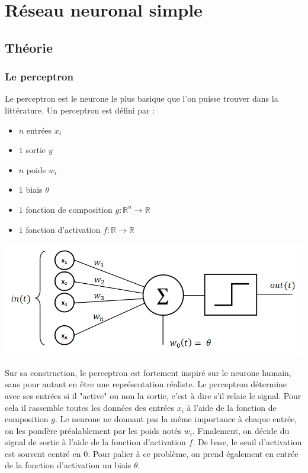 
\chapter{Réseau neuronal simple}

\section{Théorie}

\subsection{Le perceptron}

Le perceptron est le neurone le plus basique que l'on puisse trouver dans la
littérature. Un perceptron est défini par :
\begin{itemize}
\item $n$ entrées $x_i$
\item $1$ sortie $y$
\item $n$ poids $w_i$
\item $1$ biais $\theta$
\item $1$ fonction de composition $g : \mathbb{R}^n \to \mathbb{R}$
\item $1$ fonction d'activation $f : \mathbb{R} \to \mathbb{R}$
\end{itemize}

\includegraphics[scale=0.8]{images/perceptron.png}

\vspace{\parskip}
Sur sa construction, le perceptron est fortement inspiré sur le neurone humain,
sans pour autant en être une représentation réaliste.
Le perceptron détermine avec ses entrées si il "active" ou non la sortie, c'est
à dire s'il relaie le signal. Pour cela il rassemble toutes les données des
entrées $x_i$ à l'aide de la fonction de composition $g$. Le neurone ne donnant
pas la même importance à chaque entrée, on les pondère préalablement par les
poids notés $w_i$.
Finalement, on décide du signal de sortie à l'aide de la fonction d'activation
$f$. De base, le seuil d'activation est souvent centré en $0$. Pour palier à ce
problème, on prend également en entrée de la fonction d'activation un biais
$\theta$.


